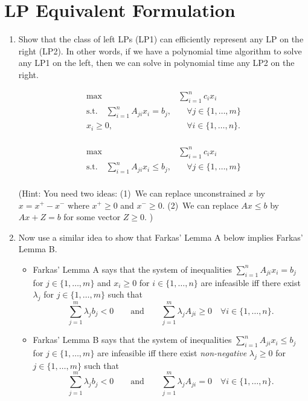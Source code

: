 \documentclass[10pt,letterpaper]{article}
\begin{document}
\section{LP Equivalent Formulation}
\begin{enumerate}
    \item Show that the class of left LPs (LP1) can efficiently represent any LP on the right (LP2). In other words, if we have a polynomial time algorithm to solve any LP1 on the left, then we can solve in polynomial time  any LP2 on the right.

\begin{minipage}{.5\linewidth}
\begin{align*}
\tag{LP1} \max& \sum_{i=1}^n c_i x_i\\
\text{s.t.}\quad \sum_{i=1}^n A_{ji} x_i = b_j, &\quad \forall j \in \{1,\ldots, m\}\\
x_i \geq 0, &\quad \forall i \in \{1,\ldots,n\}.\\
\end{align*}
      \end{minipage}%
 \quad \vrule{}
\begin{minipage}{.5\linewidth}
\begin{align*}
\tag{LP2} \max &\sum_{i=1}^n c_i x_i\\
\text{s.t.}\quad \sum_{i=1}^n A_{ji} x_i \leq b_j, &\quad \forall j \in \{1,\ldots,m\} \\
\end{align*}
      \end{minipage}
(Hint: You need two ideas: (1)~We can replace unconstrained $x$ by $x= x^+ - x^-$ where $x^+ \geq 0$ and  $x^- \geq 0$. (2)~We can replace $Ax \leq b$ by $Ax + Z=b$ for some vector $Z\geq 0$.
)



      
    \item Now use a similar idea to show that Farkas' Lemma A below implies Farkas' Lemma B.
    \begin{itemize}

         \item  Farkas' Lemma A says that the system of inequalities $\sum_{i=1}^n A_{ji} x_i = b_j$ for $j \in \{1,\ldots,m\}$ and $x_i \geq 0$ for $i\in \{1,\ldots, n\}$ are infeasible iff there exist $\lambda_j$ for $j \in \{1,\ldots,m\}$ such that 
        \[
        \sum_{j=1}^m \lambda_j b_j <0 \qquad \text{and} \qquad  
        \sum_{j=1}^m \lambda_j A_{ji} \geq 0  \quad \forall i\in \{1,\ldots, n\}.
        \]

    
        \item  Farkas' Lemma B says that the system of inequalities $\sum_{i=1}^n A_{ji} x_i \leq b_j$ for $j \in \{1,\ldots,m\}$   are infeasible iff there exist \emph{non-negative} $\lambda_j \geq 0$ for $j \in \{1,\ldots,m\}$ such that 
        \[
        \sum_{j=1}^m \lambda_j b_j < 0 \qquad \text{and} \qquad  
        \sum_{j=1}^m \lambda_j A_{ji} = 0  \quad \forall i\in \{1,\ldots, n\}.
        \]
        \end{itemize}

    
\end{enumerate}
\end{document}
